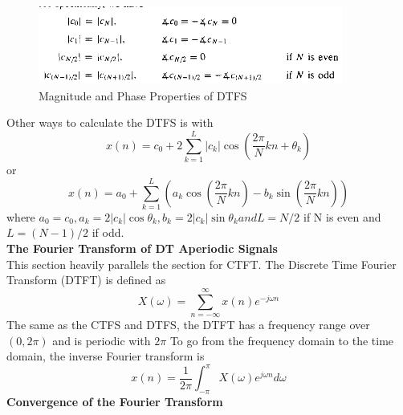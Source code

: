\documentclass{article} %
\begin{document}
	\begin{figure}[h]
	\centering
	\includegraphics[width=10cm]{sym}
	\caption{Magnitude and Phase Properties of DTFS}
	\end{figure}

	Other ways to calculate the DTFS is with
	\begin{equation}
	x(n) = c_0 + 2\sum_{k=1}^{L}|c_k|\cos (\frac{2\pi}{N}kn + \theta_k)
	\end{equation}
	or 
	\begin{equation}
	x(n) = a_0 + \sum_{k=1}^{L}(a_k \cos(\frac{2\pi}{N}kn)- b_k \sin(\frac{2\pi}{N}kn))
	\end{equation}
	where $a_0 = c_0, a_k = 2|c_k|\cos \theta_k, b_k = 2|c_k|\sin \theta_k and L = N/2$ if N is even and $L = (N-1)/2$ if odd.\\
	\textbf{The Fourier Transform of DT Aperiodic Signals}\\
	This section heavily parallels the section for CTFT. The Discrete Time Fourier Transform (DTFT) is defined as
	\begin{equation}
	X(\omega) = \sum_{n = -\infty}^{\infty}x(n)e^{-j\omega n}
	\end{equation}
	The same as the CTFS and DTFS, the DTFT has a frequency range over $(0, 2\pi)$ and is periodic with $2\pi$
	To go from the frequency domain to the time domain, the inverse Fourier transform is
	\begin{equation}
	x(n) = \frac{1}{2\pi}\int_{-\pi}^{\pi}X(\omega)e^{j\omega n}d\omega
	\end{equation}
	\textbf{Convergence of the Fourier Transform}\\
\end{document}
